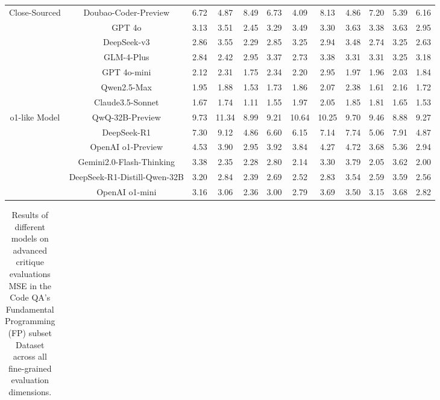 \documentclass[11pt, a4paper, logo, copyright, nonumbering, amsart]{map}
\begin{document}
\begin{CJK*}{UTF8}{gbsn}
\begin{table*}[h!]
\begin{adjustbox}{width=\textwidth}
\begin{tabular}{c|c|cccccccccc}
    \midrule
    \multirow{7}{*}{Close-Sourced} 
    & Doubao-Coder-Preview & 6.72 & 4.87 & 8.49 & 6.73 & 4.09 & 8.13 & 4.86 & 7.20 & 5.39 & 6.16 \\
    & GPT 4o & 3.13 & 3.51 & 2.45 & 3.29 & 3.49 & 3.30 & 3.63 & 3.38 & 3.63 & 2.95 \\
    & DeepSeek-v3 & 2.86 & 3.55 & 2.29 & 2.85 & 3.25 & 2.94 & 3.48 & 2.74 & 3.25 & 2.63 \\
    & GLM-4-Plus & 2.84 & 2.42 & 2.95 & 3.37 & 2.73 & 3.38 & 3.31 & 3.31 & 3.25 & 3.18 \\
    & GPT 4o-mini & 2.12 & 2.31 & 1.75 & 2.34 & 2.20 & 2.95 & 1.97 & 1.96 & 2.03 & 1.84 \\
    & Qwen2.5-Max & 1.95 & 1.88 & 1.53 & 1.73 & 1.86 & 2.07 & 2.38 & 1.61 & 2.16 & 1.72 \\
    & Claude3.5-Sonnet & 1.67 & 1.74 & 1.11 & 1.55 & 1.97 & 2.05 & 1.85 & 1.81 & 1.65 & 1.53 \\
    
    \midrule
    \multirow{6}{*}{o1-like Model} 
    & QwQ-32B-Preview & 9.73 & 11.34 & 8.99 & 9.21 & 10.64 & 10.25 & 9.70 & 9.46 & 8.88 & 9.27 \\
    & DeepSeek-R1 & 7.30 & 9.12 & 4.86 & 6.60 & 6.15 & 7.14 & 7.74 & 5.06 & 7.91 & 4.87 \\
    & OpenAI o1-Preview & 4.53 & 3.90 & 2.95 & 3.92 & 3.84 & 4.27 & 4.72 & 3.68 & 5.36 & 2.94 \\
    & Gemini2.0-Flash-Thinking & 3.38 & 2.35 & 2.28 & 2.80 & 2.14 & 3.30 & 3.79 & 2.05 & 3.62 & 2.00 \\
    & DeepSeek-R1-Distill-Qwen-32B & 3.20 & 2.84 & 2.39 & 2.69 & 2.52 & 2.83 & 3.54 & 2.59 & 3.59 & 2.56 \\
    & OpenAI o1-mini & 3.16 & 3.06 & 2.36 & 3.00 & 2.79 & 3.69 & 3.50 & 3.15 & 3.68 & 2.82 \\
    \bottomrule
    \end{tabular}
    \end{adjustbox}
\end{table*}

\begin{table*}[h!]
    \centering
    \caption{Results of different models on advanced critique evaluations MSE in the Code QA's Fundamental Programming (FP) subset Dataset across all fine-grained evaluation dimensions.} \label{table:real_level2_fp_dim}
    \begin{adjustbox}{width=\textwidth}
    \begin{tabular}{c|c|cccccccccc}
    

\end{tabular}
\end{adjustbox}
\end{table*}
\end{CJK*}
\end{document}
